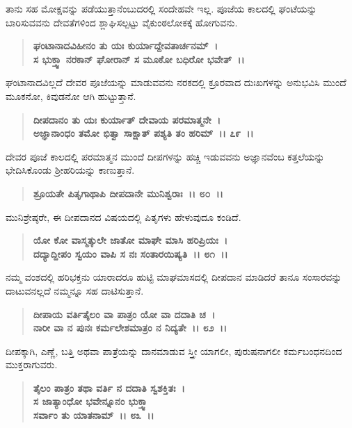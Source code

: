 ತಾನು ಸಹ ಮೋಕ್ಷವನ್ನು ಪಡೆಯುತ್ತಾನೆಂಬುದರಲ್ಲಿ ಸಂದೇಹವೇ ಇಲ್ಲ. ಪೂಜೆಯ ಕಾಲದಲ್ಲಿ ಘಂಟೆಯನ್ನು ಬಾರಿಸುವವನು ದೇವತೆಗಳಿಂದ ಶ್ಲಾಘಿಸಲ್ಪಟ್ಟು ವೈಕುಂಠಲೋಕಕ್ಕೆ ಹೋಗುವನು.

\begin{verse}
\textbf{ಘಂಟಾನಾದವಿಹೀನಂ ತು ಯಃ ಕುರ್ಯಾದ್ದೇವತಾರ್ಚನಮ್~।}\\\textbf{ಸ ಭುಕ್ತ್ವಾ ನರಕಾನ್ ಘೋರಾನ್ ಸ ಮೂಕೋ ಬಧಿರೋ ಭವೇತ್~।।}
\end{verse}

ಘಂಟಾನಾದವಿಲ್ಲದೆ ದೇವರ ಪೂಜೆಯನ್ನು ಮಾಡುವವನು ನರಕದಲ್ಲಿ ಕ್ರೂರವಾದ ದುಃಖಗಳನ್ನು ಅನುಭವಿಸಿ ಮುಂದೆ ಮೂಕನೋ, ಕಿವುಡನೋ ಆಗಿ ಹುಟ್ಟುತ್ತಾನೆ.

\begin{verse}
\textbf{ದೀಪದಾನಂ ತು ಯಃ ಕುರ್ಯಾತ್ ದೇವಾಯ ಪರಮಾತ್ಮನೇ~।}\\\textbf{ಅಜ್ಞಾನಾಂಧಂ ತಮೋ ಭಿತ್ವಾ ಸಾಕ್ಷಾತ್ ಪಶ್ಯತಿ ತಂ ಹರಿಮ್~।। ೭೯~।।}
\end{verse}

ದೇವರ ಪೂಜೆ ಕಾಲದಲ್ಲಿ ಪರಮಾತ್ಮನ ಮುಂದೆ ದೀಪಗಳನ್ನು ಹಚ್ಚಿ ಇಡುವವನು ಅಜ್ಞಾನ\-ವೆಂಬ ಕತ್ತಲೆಯನ್ನು ಭೇದಿಸಿಕೊಂಡು ಶ‍್ರೀಹರಿಯನ್ನು ಕಾಣುತ್ತಾನೆ.

\begin{verse}
\textbf{ಶ್ರೂಯತೇ ಪಿತೃಗಾಥಾಪಿ ದೀಪದಾನೇ ಮುನಿಶ್ವರಾಃ~।। ೮೦~।।}
\end{verse}

ಮುನಿಶ್ರೇಷ್ಠರೇ, ಈ ದೀಪದಾನದ ವಿಷಯದಲ್ಲಿ ಪಿತೃಗಳು ಹೇಳುವುದೂ ಕಂಡಿದೆ.

\begin{verse}
\textbf{ಯೋ ಕೋ ವಾಸ್ಮತ್ಕುಲೇ ಜಾತೋ ಮಾಘೇ ಮಾಸಿ ಹರಿಪ್ರಿಯಃ~।}\\\textbf{ದದ್ಯಾದ್ದೀಪಂ ಸ್ವಯಂ ವಾಪಿ ಸ ನಃ ಸಂತಾರಯಿಷ್ಯತಿ~।। ೮೧~।।}
\end{verse}

ನಮ್ಮ ವಂಶದಲ್ಲಿ ಹರಿಭಕ್ತನು ಯಾರಾದರೂ ಹುಟ್ಟಿ ಮಾಘಮಾಸದಲ್ಲಿ ದೀಪದಾನ ಮಾಡಿದರೆ ತಾನೂ ಸಂಸಾರವನ್ನು ದಾಟುವನಲ್ಲದೆ ನಮ್ಮನ್ನೂ ಸಹ ದಾಟಿಸುತ್ತಾನೆ.

\begin{verse}
\textbf{ದೀಪಾಯ ವರ್ತಿತೈಲಂ ವಾ ಪಾತ್ರಂ ಯೋ ವಾ ದದಾತಿ ಚ~।}\\\textbf{ನಾರೀ ವಾ ನ ಪುನಃ ಕರ್ಮಲೇಶಮಾತ್ರಂ ನ ನಿದ್ಯತೇ~।। ೮೨~।।}
\end{verse}

ದೀಪಕ್ಕಾಗಿ, ಎಣ್ಣೆ, ಬತ್ತಿ ಅಥವಾ ಪಾತ್ರೆಯನ್ನು ದಾನಮಾಡುವ ಸ್ತ್ರೀ ಯಾಗಲೀ, ಪುರುಷನಾಗಲೀ ಕರ್ಮಬಂಧನದಿಂದ ಮುಕ್ತರಾಗುವರು.

\begin{verse}
\textbf{ತೈಲಂ ಪಾತ್ರಂ ತಥಾ ವರ್ತಿ ನ ದದಾತಿ ಸ್ವಶಕ್ತಿತಃ~। }\\\textbf{ಸ ಜಾತ್ಯಾಂಧೋ ಭವೇನ್ನೂನಂ ಭುಕ್ತ್ವಾ}\\\textbf{ ಸರ್ವಾಂ ತು ಯಾತನಾಮ್~।। ೮೩~।।}
\end{verse}

